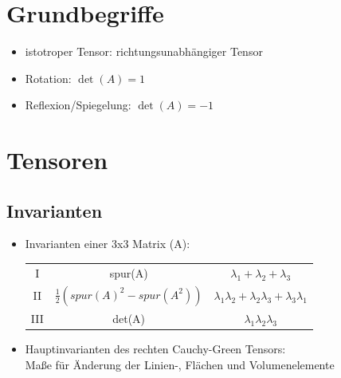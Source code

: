 \documentclass[fleqn,twoside]{article}
\title{\Huge{\textfrak{Kontinumsmechanik}}}
\author{\calligra{Jonas Konrad}}
\date{\textfrak{\today}}
\begin{document}
\parindent 0pt
\fancyfoot[R]{\frakfamily }
\maketitle \thispagestyle{empty}
\begin{center}
\end{center}
\tableofcontents
\newpage

\section{Grundbegriffe}
\begin{itemize}
    \item istotroper Tensor: richtungsunabhängiger Tensor
    \item Rotation: $\det(A)=1$
    \item Reflexion/Spiegelung: $\det(A)=-1$
\end{itemize}


\section{Tensoren}

\subsection{Invarianten}
\begin{itemize}
    \item Invarianten einer 3x3 Matrix (A):
        \begin{tabular}{c|c|c}
            I & spur(A) & $\lambda_1 + \lambda_2 + \lambda_3$ \\
            II & $\frac12 (spur(A)^2-spur(A^2))$ & $\lambda_1\lambda_2+\lambda_2\lambda_3+\lambda_3\lambda_1$ \\
            III & det(A) & $\lambda_1\lambda_2\lambda_3$
        \end{tabular}
    \item Hauptinvarianten des rechten Cauchy-Green Tensors: \\Maße für Änderung der Linien-, Flächen und Volumenelemente
\end{itemize}
\end{document}
